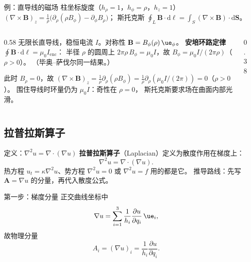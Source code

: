 \documentclass[fontset=windows, chinese, 10pt, xcolor=dvipsnames]{beamer}
\begin{document}
\begin{frame}{例：直导线的磁场}
  \footnotesize
  柱坐标旋度（$h_{\rho}=1$，$h_{\phi}=\rho$，$h_z=1$）
  $(\nabla\times\mathbf{B})_z
  =\frac{1}{\rho}\bigl(\partial_{\rho}(\rho B_{\phi})-\partial_{\phi}B_{\rho}\bigr)$；
  斯托克斯
  $\oint_L\mathbf{B}\cdot\mathrm{d}\boldsymbol{\ell}
  =\int_S(\nabla\times\mathbf{B})\cdot\mathrm{d}\mathbf{S}$。
  \begin{columns}[T]
    \begin{column}{0.58\textwidth}
      无限长直导线，稳恒电流 $I$。对称性
      $\mathbf{B}=B_{\phi}(\rho)\,\ue_{\phi}$。
      \textbf{安培环路定律}
      $\oint\mathbf{B}\cdot\mathrm{d}\boldsymbol{\ell}=\mu_0 I_{\mathrm{enc}}$：
      半径 $\rho$ 的圆周上
      $2\pi\rho\, B_{\phi}=\mu_0 I$，故
      $B_{\phi}=\mu_0 I/(2\pi\rho)$（$\rho>0$）。
      （毕奥--萨伐尔同一结果。）

      此时 $B_{\rho}=0$，故
      $(\nabla\times\mathbf{B})_z
      =\frac{1}{\rho}\partial_{\rho}(\rho B_{\phi})
      =\frac{1}{\rho}\partial_{\rho}(\mu_0 I/(2\pi))
      =0$（$\rho>0$）。
      围住导线时环量仍为 $\mu_0 I$：奇性在 $\rho=0$，
      斯托克斯要求场在曲面内部光滑。
    \end{column}
    \begin{column}{0.38\textwidth}
      \centering
      \vspace{0.8em}
      \scalebox{0.82}{}
    \end{column}
  \end{columns}
\end{frame}

\subsection{拉普拉斯算子}

\begin{frame}{定义：$\nabla^2 u=\nabla\cdot(\nabla u)$}
  \textbf{拉普拉斯算子}（Laplacian）定义为散度作用在梯度上：
  \begin{equation*}
    \nabla^2 u=\nabla\cdot(\nabla u).
  \end{equation*}
  热方程 $u_t=\kappa\nabla^2 u$、势方程 $\nabla^2 u=0$ 或 $\nabla^2 u=f$ 用的都是它。
  推导路线：先写 $\mathbf{A}=\nabla u$ 的分量，再代入散度公式。
\end{frame}

\begin{frame}{第一步：梯度分量}
  正交曲线坐标中
  \begin{equation*}
    \nabla u
    =\sum_{i=1}^{3}
      \frac{1}{h_i}\frac{\partial u}{\partial q_i}\,\ue_i,
  \end{equation*}
  故物理分量
  \begin{equation*}
    A_i
    =(\nabla u)_i
    =\frac{1}{h_i}\frac{\partial u}{\partial q_i}.
  \end{equation*}
\end{frame}
\end{document}
